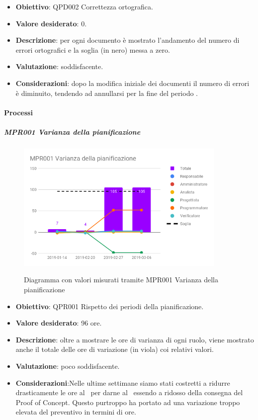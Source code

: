 	\begin{itemize}
		\item \textbf{Obiettivo}: QPD002 Correttezza ortografica.
		\item \textbf{Valore desiderato}: 0.
		\item \textbf{Descrizione}: per ogni documento è mostrato l'andamento del numero di errori ortografici e la soglia (in nero) messa a zero.
		\item \textbf{Valutazione}: soddisfacente.
		\item \textbf{Considerazioni}: dopo la modifica iniziale dei documenti il numero di errori è diminuito, tendendo ad annullarsi per la fine del periodo \RP.
	\end{itemize}



	\paragraph{Processi}

	\subparagraph{MPR001 Varianza della pianificazione}

	\begin{figure}[H]
		\centering
		\includegraphics[width=0.9\textwidth]{img/cruscotti/MPR001.png}
		\label{immagineVarianzaPianificazione}
		\caption{Diagramma con valori misurati tramite MPR001 Varianza della pianificazione}
	\end{figure}

	\begin{itemize}
		\item \textbf{Obiettivo}: QPR001 Rispetto dei periodi della pianificazione.
		\item \textbf{Valore desiderato}: 96 ore.
		\item \textbf{Descrizione}: oltre a mostrare le ore di varianza di ogni ruolo, viene mostrato anche il totale delle ore di variazione (in viola) coi relativi valori. 
		\item \textbf{Valutazione}: poco soddisfacente.
		\item \textbf{Considerazioni}:Nelle ultime settimane siamo stati costretti a ridurre drasticamente le ore al \Prog\ per darne al \Progr\ essendo a ridosso della consegna del Proof of Concept. Questo purtroppo ha portato ad una variazione troppo elevata del preventivo in termini di ore.
	\end{itemize}


